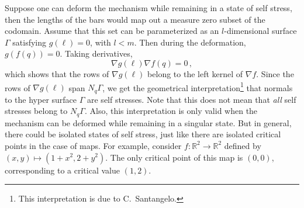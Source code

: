 Suppose one can deform the mechanism while remaining in a state of self stress, then the lengths of the bars would map out a measure zero subset of the codomain.
Assume that this set can be parameterized as an $l$-dimensional surface $\Gamma$ satisfying $g(\ell) = 0$, with $l < m$.
Then during the deformation, $g(f(q)) = 0$.
%
Taking derivatives,
\begin{equation}
  \nabla g (\ell) \nabla f (q) = 0\,,
\end{equation}
%
which shows that the rows of $\nabla g(\ell)$ belong to the left kernel of $\nabla f$.
Since the rows of $\nabla g (\ell)$ span $N_{q}\Gamma$, we get the geometrical interpretation\footnote{This interpretation is due to C.~Santangelo.} that normals to the hyper surface $\Gamma$ are self stresses.
Note that this does not mean that \emph{all} self stresses belong to $N_{q}\Gamma$.
Also, this interpretation is only valid when the mechanism can be deformed while remaining in a singular state.
But in general, there could be isolated states of self stress, just like there are isolated critical points in the case of maps.
For example, consider $f: \mathbb{R}^{2} \to \mathbb{R}^{2}$ defined by $(x, y) \mapsto (1 + x^{2}, 2 + y^{2})$.
The only critical point of this map is $(0, 0)$, corresponding to a critical value $(1, 2)$.
